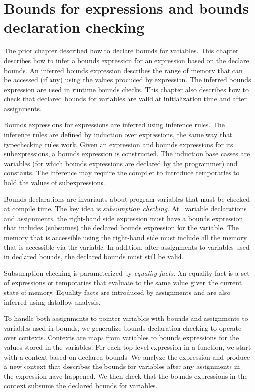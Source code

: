 
\chapter{Bounds for expressions and bounds declaration checking}
\label{chapter:checking-bounds}

The prior chapter described how to declare bounds for variables.
This chapter describes how to infer a bounds expression for 
an expression based on the declare bounds.  An inferred bounds expression
describes the range of memory that can be accessed (if any) using 
the values produced by expression.  The inferred bounds expression
are used in runtime bounds checks.   This chapter also describes how to
 check that  declared bounds for variables are valid at initialization
 time and after assignments.

Bounds expressions for expressions are inferred using inference
rules.  The inference rules are defined by induction over expressions, 
the same way that typechecking rules work.  Given an expression
and bounds expressions for its subexpressions, a bounds expression
is constructed.  The induction base casses are variables (for which
bounds expressions are declared by the programmer) and constants.
The inference may require the compiler to introduce temporaries to
hold the values of subexpressions.

Bounds declarations are invariants about program variables
that must be checked at compile time.  The key idea is {\em subsumption checking}.
At \arrayptr\ variable declarations and assignments, 
the right-hand side expression must have a bounds expression that includes (subsumes) 
the declared bounds  expression for the variable.  The memory that is accessible using
the right-hand side must include all the memory that is accessible via the variable.
In addition, after assignments to variables used in declared bounds, the
declared bounds must still be valid.

Subsumption checking is parameterized by {\it equality facts}.
An equality fact is a set of expressions or temporaries that evaluate 
to the same value given the current state of memory.  
Equality facts are introduced by assignments and are also inferred using dataflow analysis.

To handle both assignments to pointer variables with bounds and assignments
to variables used in bounds, we generalize bounds declaration
checking to operate over contexts.  Contexts are maps from variables
to bounds expressions for the values stored in the variables.  For
each top-level expression in a function, we start with a context based
on declared bounds.  We analyze the expression and produce a new
context that describes the bounds for variables after any assignments
in the expression have happened.  We then check that the bounds
expressions in the context subsume the declared bounds for variables.

